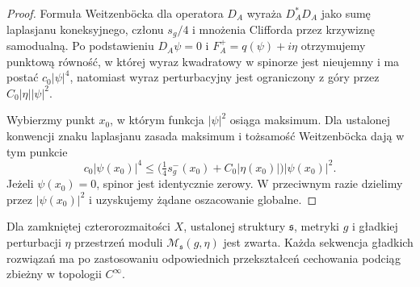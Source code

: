 \begin{proof}
Formuła Weitzenböcka dla operatora $D_A$ wyraża
$D_A^*D_A$ jako sumę laplasjanu koneksyjnego,
członu $s_g/4$ i mnożenia Clifforda przez krzywiznę
samodualną. Po podstawieniu $D_A\psi=0$ i
$F_A^+=q(\psi)+i\eta$ otrzymujemy punktową równość,
w której wyraz kwadratowy w spinorze jest
nieujemny i ma postać $c_0|\psi|^4$, natomiast
wyraz perturbacyjny jest ograniczony z góry przez
$C_0|\eta||\psi|^2$.

Wybierzmy punkt $x_0$, w którym funkcja $|\psi|^2$
osiąga maksimum. Dla ustalonej konwencji znaku
laplasjanu zasada maksimum i tożsamość Weitzenböcka
dają w tym punkcie
\[
c_0|\psi(x_0)|^4\le
\bigl(\tfrac14s_g^-(x_0)+C_0|\eta(x_0)|\bigr)
|\psi(x_0)|^2.
\]
Jeżeli $\psi(x_0)=0$, spinor jest identycznie zerowy.
W przeciwnym razie dzielimy przez $|\psi(x_0)|^2$
i uzyskujemy żądane oszacowanie globalne.
\end{proof}

\begin{twierdzenie}
\label{thm:tg-sw-compact}
Dla zamkniętej czterorozmaitości $X$, ustalonej struktury
$\mathfrak s$, metryki $g$ i gładkiej perturbacji $\eta$
przestrzeń moduli $\mathcal M_{\mathfrak s}(g,\eta)$
jest zwarta. Każda sekwencja gładkich rozwiązań ma po
zastosowaniu odpowiednich przekształceń cechowania
podciąg zbieżny w topologii $C^\infty$.
\end{twierdzenie}

